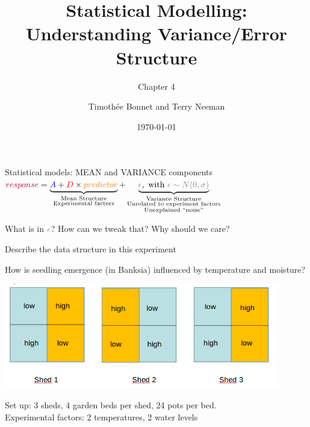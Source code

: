 \documentclass[10pt]{beamer}
\title{Statistical Modelling: Understanding Variance/Error Structure}
\subtitle{Chapter 4}
\author{Timoth\'ee Bonnet and Terry Neeman}
\date{\today}
\begin{document}



\begin{frame}{}
\maketitle

\end{frame}

\begin{frame}{Statistical models: MEAN and VARIANCE components}
\centering
  ${\color{purple}{response}} = \underbrace{{\color{blue}{A}} + {\color{red}{D}} \times {\color{orange}{predictor}}}_{\substack{\text{Mean Structure} \\ \text{Experimental factors}}} + 
  \underbrace{{\color{gray}{\epsilon}}, \text{ with } {\color{gray}{\epsilon \sim N(0,\sigma)}}}_{\substack{\text{Variance Structure} \\ \text{Unrelated to experiment factors} \\ \text{Unexplained ``noise''}}}$

  \pause 
  \vfill
  
  What is in ${\color{gray}{\epsilon}}$? How can we tweak that? Why should we care?
  \end{frame}

\begin{frame}{Describe the data structure in this experiment}
 
 How is seedling emergence (in Banksia) influenced by temperature and moisture?
 
 \includegraphics[width=0.9\textwidth]{Figures/banksiashed}


Set up: 3 sheds, 4 garden beds per shed, 24 pots per bed.\\
Experimental factors:  2 temperatures, 2 water levels

\end{frame}
\end{document}
